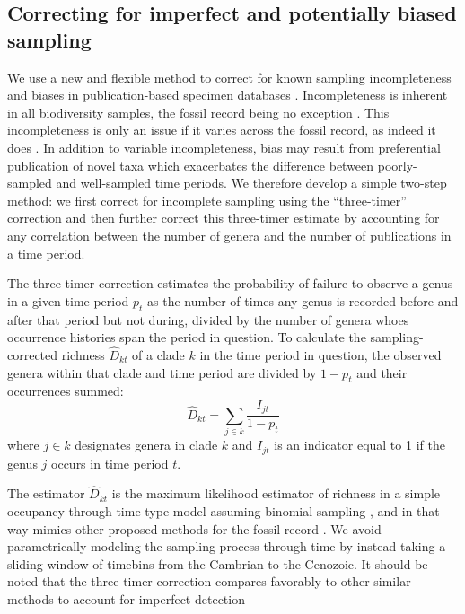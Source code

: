 \documentclass[12pt]{article}
\let\citep=\cite
\begin{document}

\subsection*{Correcting for imperfect and potentially biased sampling} 
\label{sec:3TP}
We use a new and flexible method to correct for known sampling
incompleteness and biases in publication-based specimen databases
\citep{alroy08, alroy2010}. Incompleteness is inherent in all
biodiversity samples, the fossil record being no exception
\citep{miller1996, alroy2010, foote2016, starrfelt2016,
  close2018}. This incompleteness is only an issue if it varies across
the fossil record, as indeed it does \citep{alroy2010, foote2016,
  starrfelt2016, close2018}.  In addition to variable incompleteness,
bias may result from preferential publication of novel taxa
\citep{alroy2010} which exacerbates the difference between
poorly-sampled and well-sampled time periods. We therefore develop a
simple two-step method: we first correct for incomplete sampling using
the ``three-timer'' correction \citep{alroy08} and then further
correct this three-timer estimate by accounting for any correlation
between the number of genera and the number of publications in a time
period.

The three-timer correction estimates the probability of failure to
observe a genus in a given time period $p_t$ as the number of times
any genus is recorded before and after that period but not during,
divided by the number of genera whoes occurrence histories span the
period in question.  To calculate the sampling-corrected richness
$\hat{D}_{kt}$ of a clade $k$ in the time period in question, the observed
genera within that clade and time period are divided by $1 - p_t$ and
their occurrences summed:
\begin{equation}
  \hat{D}_{kt} = \sum_{j \in k} \frac{I_{jt}}{1 - p_t}
\end{equation}
where $j \in k$ designates genera in clade $k$ and $I_{jt}$ is an
indicator equal to 1 if the genus $j$ occurs in time period $t$.

The estimator $\hat{D}_{kt}$ is the maximum likelihood estimator of
richness in a simple occupancy through time type model assuming
binomial sampling \citep{}, and in that way mimics other proposed
methods for the fossil record \citep{foote2016, starrfelt2016}. We
avoid parametrically modeling the sampling process through time by
instead taking a sliding window of timebins from the Cambrian to the
Cenozoic. It should be noted that the three-timer correction compares
favorably to other similar methods to account for imperfect detection
\citep{alroy2014}
\end{document}
